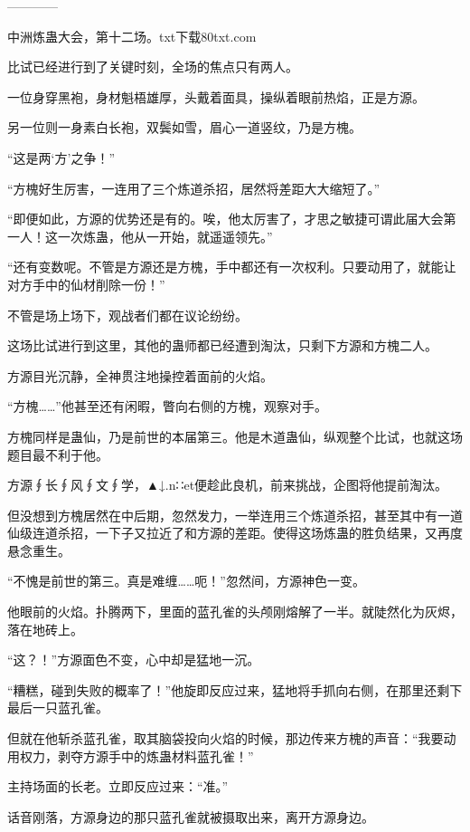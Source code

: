 
\begin{this_body}

------------

中洲炼蛊大会，第十二场。txt下载80txt.com

比试已经进行到了关键时刻，全场的焦点只有两人。

一位身穿黑袍，身材魁梧雄厚，头戴着面具，操纵着眼前热焰，正是方源。

另一位则一身素白长袍，双鬓如雪，眉心一道竖纹，乃是方槐。

“这是两‘方’之争！”

“方槐好生厉害，一连用了三个炼道杀招，居然将差距大大缩短了。”

“即便如此，方源的优势还是有的。唉，他太厉害了，才思之敏捷可谓此届大会第一人！这一次炼蛊，他从一开始，就遥遥领先。”

“还有变数呢。不管是方源还是方槐，手中都还有一次权利。只要动用了，就能让对方手中的仙材削除一份！”

不管是场上场下，观战者们都在议论纷纷。

这场比试进行到这里，其他的蛊师都已经遭到淘汰，只剩下方源和方槐二人。

方源目光沉静，全神贯注地操控着面前的火焰。

“方槐……”他甚至还有闲暇，瞥向右侧的方槐，观察对手。

方槐同样是蛊仙，乃是前世的本届第三。他是木道蛊仙，纵观整个比试，也就这场题目最不利于他。

方源∮长∮风∮文∮学，▲↓.n∷et便趁此良机，前来挑战，企图将他提前淘汰。

但没想到方槐居然在中后期，忽然发力，一举连用三个炼道杀招，甚至其中有一道仙级连道杀招，一下子又拉近了和方源的差距。使得这场炼蛊的胜负结果，又再度悬念重生。

“不愧是前世的第三。真是难缠……呃！”忽然间，方源神色一变。

他眼前的火焰。扑腾两下，里面的蓝孔雀的头颅刚熔解了一半。就陡然化为灰烬，落在地砖上。

“这？！”方源面色不变，心中却是猛地一沉。

“糟糕，碰到失败的概率了！”他旋即反应过来，猛地将手抓向右侧，在那里还剩下最后一只蓝孔雀。

但就在他斩杀蓝孔雀，取其脑袋投向火焰的时候，那边传来方槐的声音：“我要动用权力，剥夺方源手中的炼蛊材料蓝孔雀！”

主持场面的长老。立即反应过来：“准。”

话音刚落，方源身边的那只蓝孔雀就被摄取出来，离开方源身边。


\end{this_body}
